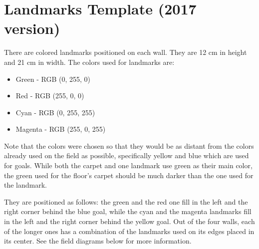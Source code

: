 \documentclass{article}
\begin{document}



\section{Landmarks Template (2017 version)\label{ref-066}}

There are colored landmarks positioned on each wall. They are 12 cm in height
and 21 cm in width. The colors used for landmarks are:

\begin{itemize}
\item Green - RGB (0, 255, 0)

\item Red - RGB (255, 0, 0)

\item Cyan - RGB (0, 255, 255)

\item Magenta - RGB (255, 0, 255)

\end{itemize}

Note that the colors were chosen so that they would be as distant from the
colors already used on the field as possible, specifically yellow and blue
which are used for goals. While both the carpet and one landmark use green as
their main color, the green used for the floor's carpet should be much darker
than the one used for the landmark.

They are positioned as follows: the green and the red one fill in the left and
the right corner behind the blue goal, while the cyan and the magenta landmarks
fill in the left and the right corner behind the yellow goal. Out of the four
walls, each of the longer ones has a combination of the landmarks used on its
edges placed in its center. See the field diagrams below for more
information.
\end{document}

